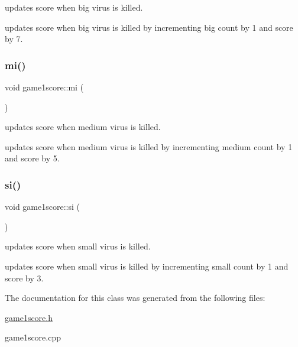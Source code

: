 updates score when big virus is killed. 

updates score when big virus is killed by incrementing big count by 1 and score by 7. \mbox{\label{classgame1score_a7b29421704c3766a8535fa878b3036d9}} 
\subsubsection{\texorpdfstring{mi()}{mi()}}
{\footnotesize\ttfamily void game1score\+::mi (\begin{DoxyParamCaption}{ }\end{DoxyParamCaption})}



updates score when medium virus is killed. 

updates score when medium virus is killed by incrementing medium count by 1 and score by 5. \mbox{\label{classgame1score_a8e7db583a40c885711eae334d4c695cd}} 
\subsubsection{\texorpdfstring{si()}{si()}}
{\footnotesize\ttfamily void game1score\+::si (\begin{DoxyParamCaption}{ }\end{DoxyParamCaption})}



updates score when small virus is killed. 

updates score when small virus is killed by incrementing small count by 1 and score by 3. 

The documentation for this class was generated from the following files\+:\begin{DoxyCompactItemize}
\item 
\hyperlink{game1score_8h}{game1score.\+h}\item 
game1score.\+cpp\end{DoxyCompactItemize}
